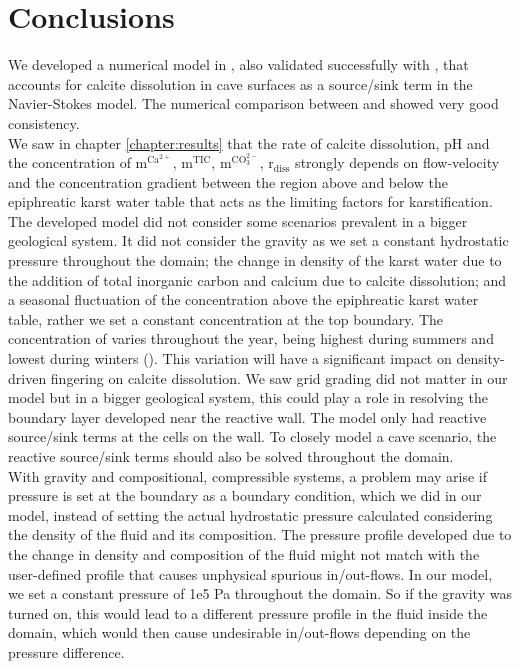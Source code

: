 \chapter{Conclusions} \label{chapter:conclusions}
\thispagestyle{empty}
We developed a numerical model in \DuMuX, also validated successfully with \MATLAB, that accounts for calcite dissolution 
in cave surfaces as a source/sink term in the Navier-Stokes model. The numerical 
comparison between \DuMuX and \MATLAB showed very good consistency.\\

We saw in chapter \ref{chapter:results} that the rate of calcite dissolution, pH and the 
concentration of $\mathrm{m^{Ca^{2+}}}$, $\mathrm{m^{TIC}}$, $\mathrm{m^{CO_3^{2-}}}$, $\mathrm{r_{diss}}$ strongly depends on 
flow-velocity and the concentration gradient between the region above and below the epiphreatic karst water table that 
acts as the limiting factors for karstification. \\

The developed model did not consider some scenarios prevalent in a bigger geological system. It did not consider the gravity 
as we set a constant hydrostatic pressure throughout the domain; the change in density of the karst water due to the addition of total inorganic carbon 
and calcium due to calcite dissolution; and a seasonal fluctuation of the  concentration above the epiphreatic karst water table, 
rather we set a constant concentration at the top boundary. The concentration of  varies throughout the year, being highest during summers and lowest during 
winters (). This variation will have a significant impact on density-driven fingering on calcite dissolution. 
We saw grid grading did not matter in our model but in a bigger geological system, this could play a role in resolving the boundary layer 
developed near the reactive wall. The \DuMuX model only had reactive source/sink terms at the cells on the wall. 
To closely model a cave scenario, the reactive source/sink terms should also be solved throughout the domain. \\

With gravity and compositional, compressible systems, a problem may arise if pressure is set at the boundary as a boundary condition, 
which we did in our model, instead of setting the actual hydrostatic pressure calculated considering the density of the fluid and its composition. 
The pressure profile developed due to the change in density and composition of the fluid might not match with the 
user-defined profile that causes unphysical spurious in/out-flows. 
In our \DuMuX model, we set a constant pressure of 1e5 Pa throughout the domain. So if the gravity was turned on, this would lead to a different 
pressure profile in the fluid inside the domain, which would then cause undesirable in/out-flows depending on the pressure 
difference. \\


